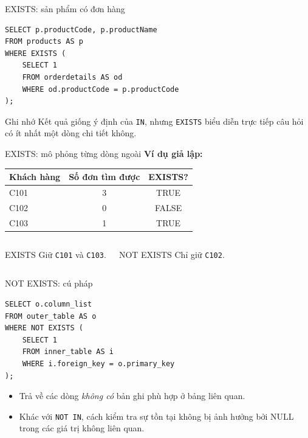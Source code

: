 \documentclass[aspectratio=169,10pt]{beamer}
\newcommand{\code}[1]{\texttt{#1}}
\begin{document}
\begin{frame}[fragile]{EXISTS: sản phẩm có đơn hàng}
\begin{lstlisting}
SELECT p.productCode, p.productName
FROM products AS p
WHERE EXISTS (
    SELECT 1
    FROM orderdetails AS od
    WHERE od.productCode = p.productCode
);
\end{lstlisting}
\begin{block}{Ghi nhớ}
\small Kết quả giống ý định của \code{IN}, nhưng \code{EXISTS} biểu diễn trực tiếp câu hỏi có ít nhất một dòng chi tiết không.
\end{block}
\end{frame}

\begin{frame}[fragile]{EXISTS: mô phỏng từng dòng ngoài}
\small\textbf{Ví dụ giả lập:}\vspace{.3em}
\begin{center}
\begin{tabular}{lcc}\toprule
Khách hàng & Số đơn tìm được & EXISTS?\\\midrule
C101 & 3 & TRUE\\
C102 & 0 & FALSE\\
C103 & 1 & TRUE\\\bottomrule
\end{tabular}
\end{center}
\vspace{.3em}
\begin{columns}[T,onlytextwidth]
\begin{block}{EXISTS}
Giữ \code{C101} và \code{C103}.
\end{block}
\begin{block}{NOT EXISTS}
Chỉ giữ \code{C102}.
\end{block}
\end{columns}
\end{frame}

\begin{frame}[fragile]{NOT EXISTS: cú pháp}
\begin{lstlisting}
SELECT o.column_list
FROM outer_table AS o
WHERE NOT EXISTS (
    SELECT 1
    FROM inner_table AS i
    WHERE i.foreign_key = o.primary_key
);
\end{lstlisting}
\begin{itemize}
\item Trả về các dòng \emph{không có} bản ghi phù hợp ở bảng liên quan.
\item Khác với \code{NOT IN}, cách kiểm tra sự tồn tại không bị ảnh hưởng bởi NULL trong các giá trị không liên quan.
\end{itemize}
\end{frame}
\end{document}
